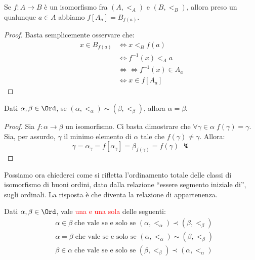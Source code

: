 \documentclass[11pt]{scrartcl}
\begin{document}
\begin{remark}
	Se $f : A \rightarrow B$ è un isomorfismo fra $(A,<_A)$ e $(B,<_B)$, allora preso un qualunque $a \in A$ abbiamo $f[A_a] = B_{f(a)}$.
\end{remark}

\begin{proof}
	Basta semplicemente osservare che:
	\[\begin{split}
		x \in B_{f(a)} &\iff x <_B f(a) \\
					   &\iff f^{-1}(x) <_A a \\
					   &\iff \iff f^{-1}(x) \in A_a \\
					   &\iff x \in f[A_a]
	\end{split}
		\]
\end{proof}

\begin{proposition}
	Dati $\alpha,\beta \in \Ord$, se $(\alpha,<_\alpha) \sim (\beta,<_\beta)$, allora $\alpha = \beta$.
\end{proposition}

\begin{proof}
	Sia $f : \alpha \rightarrow \beta$ un isomorfismo. Ci basta dimostrare che $\forall \gamma \in \alpha \; f(\gamma) = \gamma$. Sia, per assurdo,
	$\gamma$ il minimo elemento di $\alpha$ tale che $f(\gamma) \ne \gamma$. Allora:
	\[ \gamma = \alpha_\gamma = f[\alpha_\gamma] = \beta_{f(\gamma)} = f(\gamma)\;\lightning
		\]
\end{proof}

Possiamo ora chiederci come si rifletta l'ordinamento totale delle classi di isomorfismo di buoni ordini, dato dalla relazione 
``essere segmento iniziale di'', sugli ordinali. La risposta è che diventa la relazione di appartenenza.

\begin{theorem}
	Dati $\alpha,\beta \in\Ord$, vale \textcolor{red}{una e una sola} delle seguenti:
	\begin{align*}
		& \alpha \in \beta \;\text{che vale se e solo se $(\alpha,<_\alpha) \prec (\beta,<_\beta)$} \\
		& \alpha = \beta \;\text{che vale se e solo se $(\alpha,<_\alpha) \sim (\beta,<_\beta)$} \\
		& \beta \in \alpha \;\text{che vale se e solo se $(\beta,<_\beta) \prec (\alpha,<_\alpha)$}
	\end{align*}
\end{theorem}
\end{document}
